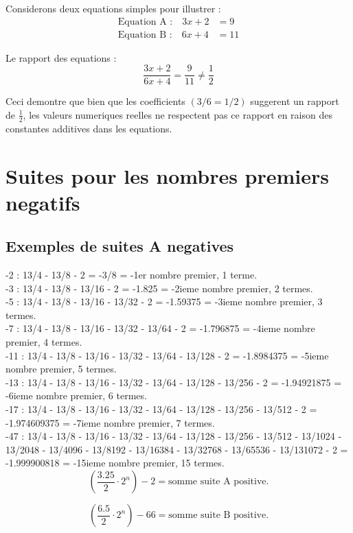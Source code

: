 \documentclass[a4paper,11pt]{article}
\begin{document}
Considerons deux equations simples pour illustrer :
\begin{align}
\text{Equation A :} \quad 3x + 2 &= 9 \\
\text{Equation B :} \quad 6x + 4 &= 11
\end{align}

Le rapport des equations :
\[
\frac{3x + 2}{6x + 4} = \frac{9}{11} \neq \frac{1}{2}
\]

Ceci demontre que bien que les coefficients $(3/6 = 1/2)$ suggerent un rapport de $\frac{1}{2}$, les valeurs numeriques reelles ne respectent pas ce rapport en raison des constantes additives dans les equations.

\section*{Suites pour les nombres premiers negatifs}

\subsection*{Exemples de suites A negatives}

-2 : 13/4 - 13/8 - 2 = -3/8 = -1er nombre premier, 1 terme.\\
-3 : 13/4 - 13/8 - 13/16 - 2 = -1.825 = -2ieme nombre premier, 2 termes.\\
-5 : 13/4 - 13/8 - 13/16 - 13/32 - 2 = -1.59375 = -3ieme nombre premier, 3 termes.\\
-7 : 13/4 - 13/8 - 13/16 - 13/32 - 13/64 - 2 = -1.796875 = -4ieme nombre premier, 4 termes.\\
-11 : 13/4 - 13/8 - 13/16 - 13/32 - 13/64 - 13/128 - 2 = -1.8984375 = -5ieme nombre premier, 5 termes.\\
-13 : 13/4 - 13/8 - 13/16 - 13/32 - 13/64 - 13/128 - 13/256 - 2 = -1.94921875 = -6ieme nombre premier, 6 termes.\\
-17 : 13/4 - 13/8 - 13/16 - 13/32 - 13/64 - 13/128 - 13/256 - 13/512 - 2 = -1.974609375 = -7ieme nombre premier, 7 termes.\\

-47 : 13/4 - 13/8 - 13/16 - 13/32 - 13/64 - 13/128 - 13/256 - 13/512 - 13/1024 - 13/2048 - 13/4096 - 13/8192 - 13/16384 - 13/32768 - 13/65536 - 13/131072 - 2 = -1.999900818 = -15ieme nombre premier, 15 termes.\\

\[
\left(\frac{3.25}{2} \cdot 2^{n}\right) - 2 = \text{somme suite A positive.}
\]

\[
\left(\frac{6.5}{2} \cdot 2^{n}\right) - 66 = \text{somme suite B positive.}
\]
\end{document}
